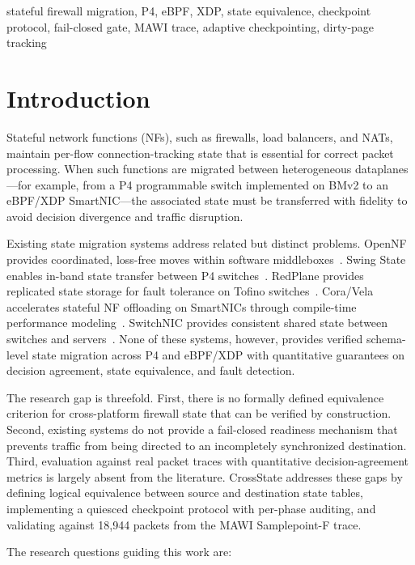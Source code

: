 \documentclass[10pt, conference]{IEEEtran}
\begin{document}
\begin{keywords}
stateful firewall migration, P4, eBPF, XDP, state equivalence, checkpoint protocol, fail-closed gate, MAWI trace, adaptive checkpointing, dirty-page tracking
\end{keywords}

\section{Introduction}
\label{sec:introduction}

Stateful network functions (NFs), such as firewalls, load balancers, and NATs, maintain per-flow connection-tracking state that is essential for correct packet processing. When such functions are migrated between heterogeneous dataplanes---for example, from a P4 programmable switch implemented on BMv2 to an eBPF/XDP SmartNIC---the associated state must be transferred with fidelity to avoid decision divergence and traffic disruption.

Existing state migration systems address related but distinct problems. OpenNF provides coordinated, loss-free moves within software middleboxes~\cite{gember2014opennf}. Swing State enables in-band state transfer between P4 switches~\cite{luo2017swing}. RedPlane provides replicated state storage for fault tolerance on Tofino switches~\cite{kim2021redplane}. Cora/Vela accelerates stateful NF offloading on SmartNICs through compile-time performance modeling~\cite{xi2024cora}. SwitchNIC provides consistent shared state between switches and servers~\cite{lei2025switchnic}. None of these systems, however, provides verified schema-level state migration across P4 and eBPF/XDP with quantitative guarantees on decision agreement, state equivalence, and fault detection.

The research gap is threefold. First, there is no formally defined equivalence criterion for cross-platform firewall state that can be verified by construction. Second, existing systems do not provide a fail-closed readiness mechanism that prevents traffic from being directed to an incompletely synchronized destination. Third, evaluation against real packet traces with quantitative decision-agreement metrics is largely absent from the literature. CrossState addresses these gaps by defining logical equivalence between source and destination state tables, implementing a quiesced checkpoint protocol with per-phase auditing, and validating against 18{,}944 packets from the MAWI Samplepoint-F trace.

The research questions guiding this work are:
\end{document}
